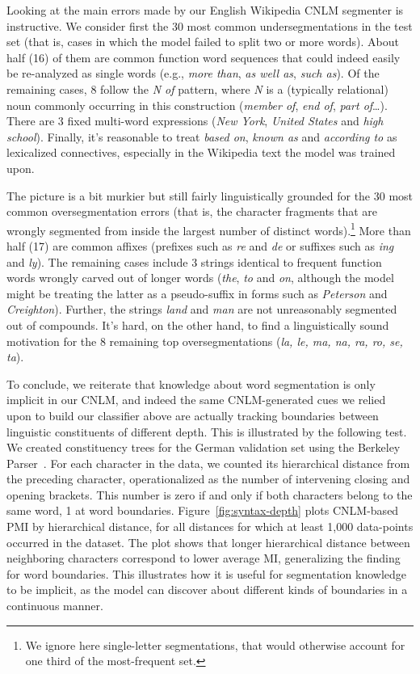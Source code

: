 
Looking at the main errors made by our English Wikipedia CNLM
segmenter is instructive. We consider first the 30 most common
undersegmentations in the test set (that is, cases in which the model
failed to split two or more words). About half (16) of them are common
function word sequences that could indeed easily be re-analyzed as
single words (e.g., \emph{more than}, \emph{as well as}, \emph{such
  as}). Of the remaining cases, 8 follow the \emph{N of} pattern,
where \emph{N} is a (typically relational) noun commonly occurring in
this construction (\emph{member of}, \emph{end of}, \emph{part
  of}\ldots). There are 3 fixed multi-word expressions (\emph{New
  York}, \emph{United States} and \emph{high school}). Finally, it's
reasonable to treat \emph{based on}, \emph{known as} and
\emph{according to} as lexicalized connectives, especially in the
Wikipedia text the model was trained upon.

The picture is a bit murkier but still fairly linguistically grounded
for the 30 most common oversegmentation errors (that is, the character
fragments that are wrongly segmented from inside the largest number of
distinct words).\footnote{We ignore here single-letter segmentations,
  that would otherwise account for one third of the most-frequent
  set.}  More than half (17) are common affixes (prefixes such as
\emph{re} and \emph{de} or suffixes such as \emph{ing} and
\emph{ly}). The remaining cases include 3 strings identical to frequent
function words wrongly carved out of longer words (\emph{the},
\emph{to} and \emph{on}, although the model might be treating the
latter as a pseudo-suffix in forms such as \emph{Peterson} and
\emph{Creighton}). Further, the strings \emph{land} and \emph{man} are not
unreasonably segmented out of compounds. It's hard, on the other hand,
to find a linguistically sound motivation for the 8 remaining top
oversegmentations (\emph{la, le, ma, na, ra, ro, se, ta}).

To conclude, we reiterate that knowledge about word segmentation is
only implicit in our CNLM, and indeed the same CNLM-generated cues we
relied upon to build our classifier above are actually tracking
boundaries between linguistic constituents of different depth. This is
illustrated by the following test. We created constituency trees for
the German validation set using the Berkeley
Parser~\cite{petrov2007improved}.  For each character in the data, we
counted its hierarchical distance from the preceding character,
operationalized as the number of intervening closing and opening
brackets.  This number is zero if and only if both characters belong
to the same word, 1 at word boundaries. Figure~\ref{fig:syntax-depth}
plots CNLM-based PMI by hierarchical distance, for all distances for
which at least 1,000 data-points occurred in the dataset.  The plot
shows that longer hierarchical distance between neighboring characters
correspond to lower average MI, generalizing the finding for word
boundaries.  This illustrates how it is useful for segmentation
knowledge to be implicit, as the model can discover about different
kinds of boundaries in a continuous manner.


